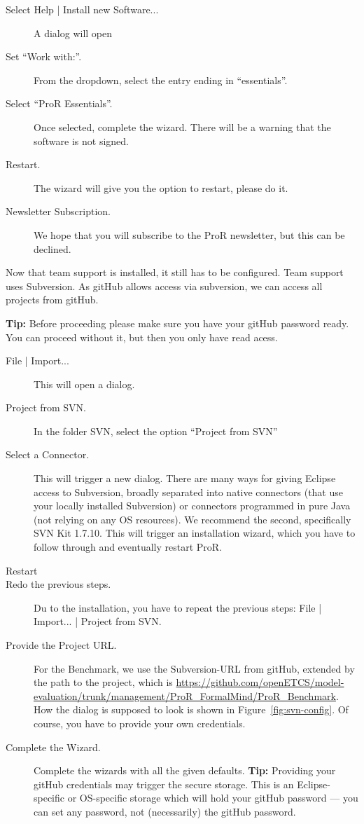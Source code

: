 \documentclass{template/openetcs_report}
\begin{document}
\begin{description}

\item[Select Help | Install new Software...] A dialog will open

\item[Set ``Work with:''.]  From the dropdown, select the entry ending in ``essentials''.

\item[Select ``ProR Essentials''.]  Once selected, complete the wizard.  There will be a warning that the software is not signed.

\item[Restart.] The wizard will give you the option to restart, please do it.

\item[Newsletter Subscription.] We hope that you will subscribe to the ProR newsletter, but this can be declined.

\end{description}

Now that team support is installed, it still has to be configured.  Team support uses Subversion.  As gitHub allows access via subversion, we can access all projects from gitHub.

\textbf{Tip:} Before proceeding please make sure you have your gitHub password ready.  You can proceed without it, but then you only have read acess.

\begin{description}
\item[File | Import...] This will open a dialog.
\item[Project from SVN.] In the folder SVN, select the option ``Project from SVN''
\item[Select a Connector.] This will trigger a new dialog.  There are many ways for giving Eclipse access to Subversion, broadly separated into native connectors (that use your locally installed Subversion) or connectors programmed in pure Java (not relying on any OS resources).  We recommend the second, specifically SVN Kit 1.7.10.  This will trigger an installation wizard, which you have to follow through and eventually restart ProR.
\item[Restart]
\item[Redo the previous steps.]  Du to the installation, you have to repeat the previous steps: File | Import... | Project from SVN.
\item[Provide the Project URL.] For the Benchmark, we use the Subversion-URL from gitHub, extended by the path to the project, which is \url{https://github.com/openETCS/model-evaluation/trunk/management/ProR_FormalMind/ProR_Benchmark}.  How the dialog is supposed to look is shown in Figure~\ref{fig:svn-config}.  Of course, you have to provide your own credentials.
\item[Complete the Wizard.]  Complete the wizards with all the given defaults.   \textbf{Tip:} Providing your gitHub credentials may trigger the secure storage.  This is an Eclipse-specific or OS-specific storage which will hold your gitHub password --- you can set any password, not (necessarily) the gitHub password.

\end{description}
\end{document}
